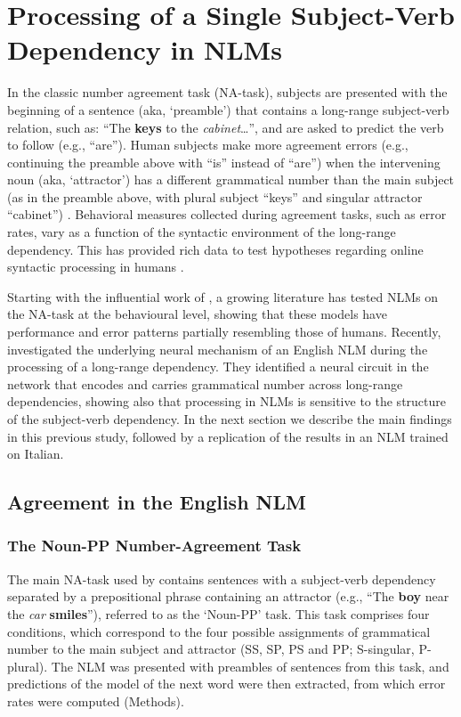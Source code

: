 \section{Processing of a Single Subject-Verb Dependency in NLMs}
In the classic number agreement task (NA-task), subjects are presented with the beginning of a sentence (aka, `preamble') that contains a long-range subject-verb relation, such as: ``The \textbf{keys} to the \emph{cabinet}\ldots'', and are asked to predict the verb to follow (e.g., ``are''). 
Human subjects make more agreement errors (e.g., continuing the preamble  above with ``is'' instead of ``are'') when the intervening noun (aka, `attractor') has a different grammatical number than the main subject (as in the preamble above, with plural subject ``keys'' and singular attractor ``cabinet'') \citep{}.
Behavioral measures collected during agreement tasks, such as error rates, vary as a function of the syntactic environment of the long-range dependency. This has provided rich data to test hypotheses regarding online syntactic processing in humans \citep[e.g., ][]{franck2002subject, franck2006agreement, franck2007syntactic}.

Starting with the influential work of \citet{Linzen:etal:2016}, a growing
literature \citep[e.g.,][]{Gulordava:etal:2018, Bernardy:Lappin:2017,
  Giulianelli:etal:2018, Kuncoro:etal:2018a,Linzen:Leonard:2018,jumelet2019analysing} has
tested NLMs on the NA-task at the behavioural level, showing that these models have performance and error patterns partially resembling those of humans.
Recently, \citet{lakretz2019emergence} investigated the underlying neural mechanism of an English NLM during the processing of a long-range dependency. They identified a neural circuit in the network that encodes and carries grammatical number across long-range dependencies, showing also that processing in NLMs is sensitive to the structure of the subject-verb dependency. 
In the next section we describe the main findings in this previous study, followed by a replication of the results in an NLM trained on Italian. 

\subsection{Agreement in the English NLM}

\subsubsection{The Noun-PP Number-Agreement Task}
The main NA-task used by \citet{lakretz2019emergence} contains sentences with a subject-verb dependency separated by a prepositional phrase containing an attractor (e.g., ``The \textbf{boy} near the \emph{car} \textbf{smiles}''), referred to as the `Noun-PP' task. This task comprises four conditions, which correspond to the four possible assignments of grammatical number to the main subject and attractor (SS, SP, PS and PP; S-singular, P-plural). The NLM was presented with preambles of sentences from this task, and predictions of the model of the next word were then extracted, from which error rates were computed (Methods). 

